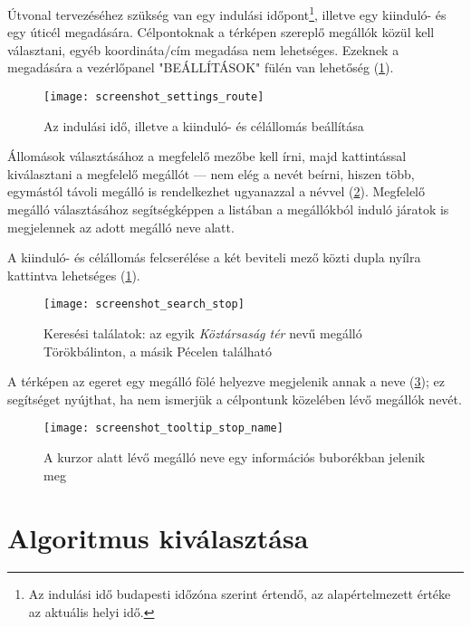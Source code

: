 Útvonal tervezéséhez szükség van egy indulási időpont\footnote{Az indulási idő budapesti időzóna szerint értendő, az alapértelmezett értéke az aktuális helyi idő.}, illetve egy kiinduló- és egy úticél megadására. Célpontoknak a térképen szereplő megállók közül kell választani, egyéb koordináta/cím megadása nem lehetséges. Ezeknek a megadására a vezérlőpanel "BEÁLLÍTÁSOK" fülén van lehetőség (\ref{fig:screenshot-settings-route}).

\begin{figure}[H]
	\centering
	\texttt{[image: screenshot\_settings\_route]}
	\caption{Az indulási idő, illetve a kiinduló- és célállomás beállítása}
	\label{fig:screenshot-settings-route}
\end{figure}

Állomások választásához a megfelelő mezőbe kell írni, majd kattintással kiválasztani a megfelelő megállót --- nem elég a nevét beírni, hiszen több, egymástól távoli megálló is rendelkezhet ugyanazzal a névvel (\ref{fig:screenshot-search-stop}). Megfelelő megálló választásához segítségképpen a listában a megállókból induló járatok is megjelennek az adott megálló neve alatt.

A kiinduló- és célállomás felcserélése a két beviteli mező közti dupla nyílra kattintva lehetséges (\ref{fig:screenshot-settings-route}).

\begin{figure}[H]
	\centering
	\texttt{[image: screenshot\_search\_stop]}
	\caption{Keresési találatok: az egyik \emph{Köztársaság tér} nevű megálló Törökbálinton, a másik Pécelen található}
	\label{fig:screenshot-search-stop}
\end{figure}

A térképen az egeret egy megálló fölé helyezve megjelenik annak a neve (\ref{fig:screenshot-tooltip-stop-name}); ez segítséget nyújthat, ha nem ismerjük a célpontunk közelében lévő megállók nevét.

\begin{figure}[H]
	\centering
	\texttt{[image: screenshot\_tooltip\_stop\_name]}
	\caption{A kurzor alatt lévő megálló neve egy információs buborékban jelenik meg}
	\label{fig:screenshot-tooltip-stop-name}
\end{figure}

\section{Algoritmus kiválasztása}

